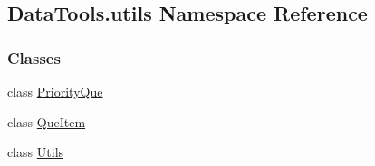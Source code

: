 \hypertarget{namespaceDataTools_1_1utils}{}\subsection{Data\+Tools.\+utils Namespace Reference}
\label{namespaceDataTools_1_1utils}
\subsubsection*{Classes}
\begin{DoxyCompactItemize}
\item 
class \hyperlink{classDataTools_1_1utils_1_1PriorityQue}{Priority\+Que}
\item 
class \hyperlink{classDataTools_1_1utils_1_1QueItem}{Que\+Item}
\item 
class \hyperlink{classDataTools_1_1utils_1_1Utils}{Utils}
\end{DoxyCompactItemize}
